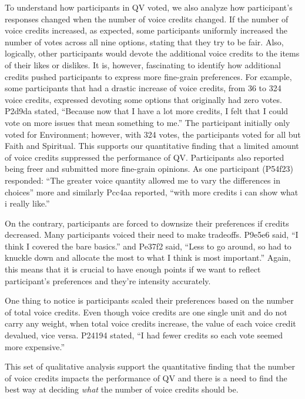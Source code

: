 To understand how participants in QV voted, we also analyze how participant's responses changed when the number of voice credits changed. 
If the number of voice credits increased, as expected, some participants uniformly increased the number of votes across all nine options, stating that they try to be fair. Also, logically, other participants would devote the additional voice credits to the items of their likes or dislikes. 
It is, however, fascinating to identify how additional credits pushed participants to express more fine-grain preferences.
For example, some participants that had a drastic increase of voice credits, from 36 to 324 voice credits, expressed devoting some options that originally had zero votes. 
P2d9da stated, ``Because now that I have a lot more credits, I felt that I could vote on more issues that mean something to me.'' The participant initially only voted for Environment; however, with 324 votes, the participants voted for all but Faith and Spiritual. This supports our quantitative finding that a limited amount of voice credits suppressed the performance of QV. Participants also reported being freer and submitted more fine-grain opinions. As one participant (P54f23) responded: ``The greater voice quantity allowed me to vary the differences in choices'' more and similarly Pcc4aa reported, ``with more credits i can show what i really like.''

On the contrary, participants are forced to downsize their preferences if credits decreased. Many participants voiced their need to make tradeoffs. P9e5e6 said, ``I think I covered the bare basics.'' and Pe37f2 said, ``Less to go around, so had to knuckle down and allocate the most to what I think is most important.'' Again, this means that it is crucial to have enough points if we want to reflect participant's preferences and they're intensity accurately.

One thing to notice is participants scaled their preferences based on the number of total voice credits. Even though voice credits are one single unit and do not carry any weight, when total voice credits increase, the value of each voice credit devalued, vice versa. P24194 stated, ``I had fewer credits so each vote seemed more expensive.''

This set of qualitative analysis support the quantitative finding that the number of voice credits impacts the performance of QV and there is a need to find the best way at deciding \textit{what} the number of voice credits should be.